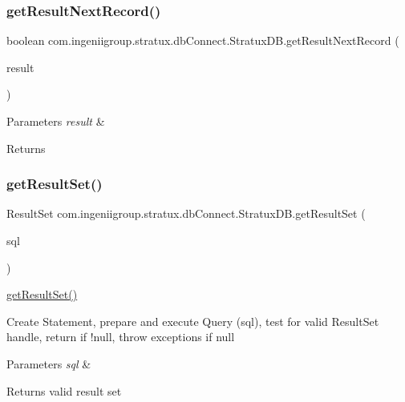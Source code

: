 \subsubsection{\texorpdfstring{get\+Result\+Next\+Record()}{getResultNextRecord()}}
{\footnotesize\ttfamily boolean com.\+ingeniigroup.\+stratux.\+db\+Connect.\+Stratux\+D\+B.\+get\+Result\+Next\+Record (\begin{DoxyParamCaption}\item[{Result\+Set}]{result }\end{DoxyParamCaption})}


\begin{DoxyParams}{Parameters}
{\em result} & \\
\hline
\end{DoxyParams}
\begin{DoxyReturn}{Returns}

\end{DoxyReturn}
\mbox{\label{classcom_1_1ingeniigroup_1_1stratux_1_1db_connect_1_1_stratux_d_b_a72b53be8e33efb394803391c08d16597}} 
\subsubsection{\texorpdfstring{get\+Result\+Set()}{getResultSet()}}
{\footnotesize\ttfamily Result\+Set com.\+ingeniigroup.\+stratux.\+db\+Connect.\+Stratux\+D\+B.\+get\+Result\+Set (\begin{DoxyParamCaption}\item[{String}]{sql }\end{DoxyParamCaption})}

\hyperlink{classcom_1_1ingeniigroup_1_1stratux_1_1db_connect_1_1_stratux_d_b_a72b53be8e33efb394803391c08d16597}{get\+Result\+Set()}

Create Statement, prepare and execute Query (sql), test for valid Result\+Set handle, return if !null, throw exceptions if null


\begin{DoxyParams}{Parameters}
{\em sql} & \\
\hline
\end{DoxyParams}
\begin{DoxyReturn}{Returns}
valid result set 
\end{DoxyReturn}
\mbox{\label{classcom_1_1ingeniigroup_1_1stratux_1_1db_connect_1_1_stratux_d_b_a3266867c1ec4338f4324440116140324}} 

